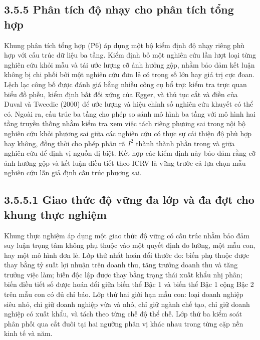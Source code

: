 \documentclass[
  a4paper,
  13pt]{extreport}
\begin{document}
\hypertarget{phuxe2n-tuxedch-ux111ux1ed9-nhux1ea1y-cho-phuxe2n-tuxedch-tux1ed5ng-hux1ee3p}{%
\subsection{3.5.5 Phân tích độ nhạy cho phân tích tổng
hợp}\label{phuxe2n-tuxedch-ux111ux1ed9-nhux1ea1y-cho-phuxe2n-tuxedch-tux1ed5ng-hux1ee3p}}

Khung phân tích tổng hợp (P6) áp dụng một bộ kiểm định độ nhạy riêng phù
hợp với cấu trúc dữ liệu ba tầng. Kiểm định bỏ một nghiên cứu lần lượt
loại từng nghiên cứu khỏi mẫu và tái ước lượng cỡ ảnh hưởng gộp, nhằm
bảo đảm kết luận không bị chi phối bởi một nghiên cứu đơn lẻ có trọng số
lớn hay giá trị cực đoan. Lệch lạc công bố được đánh giá bằng nhiều công
cụ bổ trợ: kiểm tra trực quan biểu đồ phễu, kiểm định bất đối xứng của
Egger, và thủ tục cắt và điền của Duval và Tweedie (2000) để ước lượng
và hiệu chỉnh số nghiên cứu khuyết có thể có. Ngoài ra, cấu trúc ba tầng
cho phép so sánh mô hình ba tầng với mô hình hai tầng truyền thống nhằm
kiểm tra xem việc tách riêng phương sai trong nội bộ nghiên cứu khỏi
phương sai giữa các nghiên cứu có thực sự cải thiện độ phù hợp hay
không, đồng thời cho phép phân rã \(I^2\) thành thành phần trong và giữa
nghiên cứu để định vị nguồn dị biệt. Kết hợp các kiểm định này bảo đảm
rằng cỡ ảnh hưởng gộp và kết luận điều tiết theo ICRV là vững trước cả
lựa chọn mẫu nghiên cứu lẫn giả định cấu trúc phương sai.

\hypertarget{giao-thux1ee9c-ux111ux1ed9-vux1eefng-ux111a-lux1edbp-vuxe0-ux111a-ux111ux1ee3t-cho-khung-thux1ef1c-nghiux1ec7m}{%
\subsection{3.5.5.1 Giao thức độ vững đa lớp và đa đợt cho khung thực
nghiệm}\label{giao-thux1ee9c-ux111ux1ed9-vux1eefng-ux111a-lux1edbp-vuxe0-ux111a-ux111ux1ee3t-cho-khung-thux1ef1c-nghiux1ec7m}}

Khung thực nghiệm áp dụng một giao thức độ vững có cấu trúc nhằm bảo đảm
suy luận trọng tâm không phụ thuộc vào một quyết định đo lường, một mẫu
con, hay một mô hình đơn lẻ. Lớp thứ nhất hoán đổi thước đo: biến phụ
thuộc được thay bằng tỷ suất lợi nhuận trên doanh thu, tăng trưởng doanh
thu và tăng trưởng việc làm; biến độc lập được thay bằng trạng thái xuất
khẩu nhị phân; biến điều tiết số được hoán đổi giữa biến thể Bậc 1 và
biến thể Bậc 1 cộng Bậc 2 trên mẫu con có đủ chỉ báo. Lớp thứ hai giới
hạn mẫu con: loại doanh nghiệp siêu nhỏ, chỉ giữ doanh nghiệp vừa và
nhỏ, chỉ giữ ngành chế tạo, chỉ giữ doanh nghiệp có xuất khẩu, và tách
theo từng chế độ thể chế. Lớp thứ ba kiểm soát phân phối qua cắt đuôi
tại hai ngưỡng phân vị khác nhau trong từng cặp nền kinh tế và năm.
\end{document}
